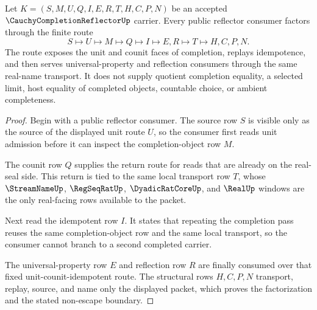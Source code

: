 \begin{theorem}
\label{thm:cauchy-completion-reflector-unit-counit-route}
Let $K=(S,M,U,Q,I,E,R,T,H,C,P,N)$ be an accepted $\CauchyCompletionReflectorUp$ carrier. Every public reflector consumer factors through the finite route
$$
S\longmapsto U\longmapsto M\longmapsto Q\longmapsto I\longmapsto E,R\longmapsto T\longmapsto H,C,P,N .
$$
The route exposes the unit and counit faces of completion, replays idempotence, and then serves universal-property and reflection consumers through the same real-name transport. It does not supply quotient completion equality, a selected limit, host equality of completed objects, countable choice, or ambient completeness.
\end{theorem}
\begin{proof}
Begin with a public reflector consumer. The source row $S$ is visible only as the source of the displayed unit route $U$, so the consumer first reads unit admission before it can inspect the completion-object row $M$.

The counit row $Q$ supplies the return route for reads that are already on the real-seal side. This return is tied to the same local transport row $T$, whose $\StreamNameUp$, $\RegSeqRatUp$, $\DyadicRatCoreUp$, and $\RealUp$ windows are the only real-facing rows available to the packet.

Next read the idempotent row $I$. It states that repeating the completion pass reuses the same completion-object row and the same local transport, so the consumer cannot branch to a second completed carrier.

The universal-property row $E$ and reflection row $R$ are finally consumed over that fixed unit-counit-idempotent route. The structural rows $H,C,P,N$ transport, replay, source, and name only the displayed packet, which proves the factorization and the stated non-escape boundary.
\end{proof}

